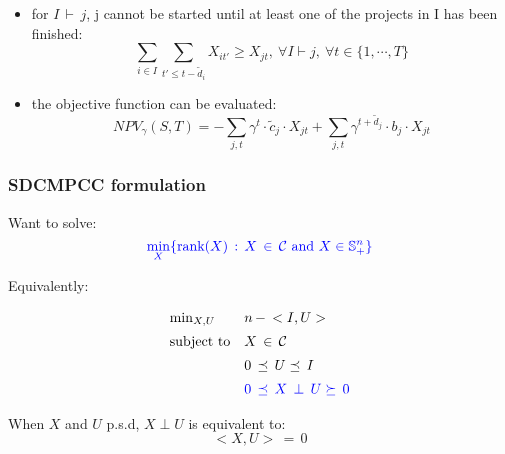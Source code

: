 \documentclass{beamer}
\newcommand{\tblue}{\textcolor{blue}}
\begin{document}
		\begin{frame}
			\begin{itemize}
				\item for $I\,\vdash\,j$, j cannot be started until at least one of the projects in I has been finished:
					\begin{equation*}
						\label{EqnAnyPrecedence}
						\sum\limits_{i\in I}\sum\limits_{t'\leq t-\tilde{d}_i} X_{it'} \geq X_{jt},~\forall I \vdash j,~\forall t \in \{1,\cdots,T\}
					\end{equation*}
				\item the objective function can be evaluated:
					\begin{equation*}
						NPV_{\gamma}(S,T) = -\sum\limits_{j,t} \gamma^t \cdot \tilde{c}_j \cdot X_{jt} + \sum\limits_{j,t} \gamma^{t+\tilde{d}_j} \cdot b_j \cdot X_{jt}
					\end{equation*}
			\end{itemize}
		\end{frame}



\begin{frame}
\frametitle{SDCMPCC formulation}

Want to solve:
\begin{displaymath}
\tblue{\min_X \{\mbox{rank} (X) \, : \, X\,\in\,\mathcal{C} ~\mbox{and}~ X \in \mathbb{S}^{n}_+\}}
\end{displaymath}

\bigskip

Equivalently:

\begin{displaymath}
\begin{array}{lll}
\min_{X,U} & n\,-\,<I, U> \\  [5pt]
\mbox{subject to} & X\,\in\,\mathcal{C} \\ [5pt]
& 0 \, \preceq \, U \preceq \, I  \\ [5pt]
& {\tblue{0 \, \preceq \, X \,\perp\, U \succeq \, 0}}
\end{array}
\end{displaymath}

\bigskip
When $X$ and $U$ p.s.d, $X\perp U$ is equivalent to:
\begin{displaymath}
<X, U>\,=\,0
\end{displaymath}
\end{frame}
\end{document}
